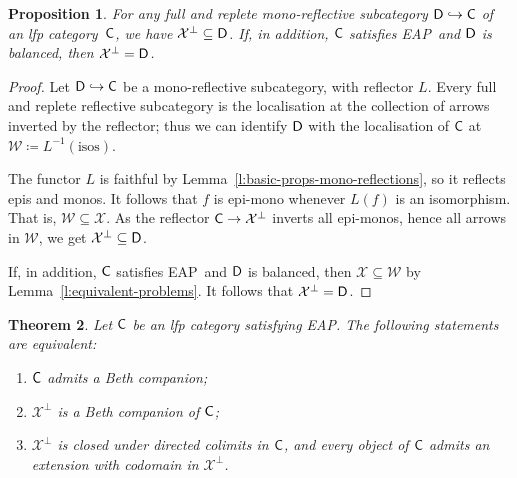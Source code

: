 \documentclass[a4paper,10pt,reqno]{amsart}
\newtheorem{theorem}{Theorem}[section]
\newtheorem{proposition}[theorem]{Proposition}
\theoremstyle{definition}
\theoremstyle{remark}
\newcommand{\cat}{{\sf C}}								%
\newcommand{\catt}{{\sf D}}								%
\newcommand{\ar}[1]{\mathcal{#1}}							%
\newcommand{\X}{\ar{X}}									%
\newcommand{\into}{\hookrightarrow}						%
\newcommand{\ort}[1]{{#1}^{\perp}}						%
\newcommand{\EAP}{\textnormal{EAP}}
\begin{document}
\begin{proposition}\label{p:localisation-is-X-ort}
For any full and replete mono-reflective subcategory $\catt\into \cat$ of an lfp category~$\cat$, we have $\ort{\X}\subseteq \catt$. If, in addition, $\cat$ satisfies \EAP~and $\catt$ is balanced, then $\ort{\X}= \catt$.
\end{proposition}
%
\begin{proof}
Let $\catt\into \cat$ be a mono-reflective subcategory, with reflector $L$. Every full and replete reflective subcategory is the localisation at the collection of arrows inverted by the reflector; thus we can identify $\catt$ with the localisation of $\cat$ at $\ar{W}\coloneqq L^{-1}(\text{isos})$. 

The functor $L$ is faithful by Lemma~\ref{l:basic-props-mono-reflections}, so it reflects epis and monos. It follows that $f$ is epi-mono whenever $L(f)$ is an isomorphism. That is, $\ar{W}\subseteq \X$.
%
As the reflector $\cat \to \ort{\X}$ inverts all epi-monos, hence all arrows in $\ar{W}$, we get $\ort{\X}\subseteq \catt$.

If, in addition, $\cat$ satisfies \EAP~and $\catt$ is balanced, then $\X\subseteq \ar{W}$ by Lemma~\ref{l:equivalent-problems}. It follows that $\ort{\X}= \catt$.
\end{proof}

\begin{theorem}\label{t:Beth-companion-amalgam-orthogonal}
Let $\cat$ be an lfp category satisfying \EAP.
The following statements are equivalent:
\begin{enumerate}[label=(\arabic*)]
\item\label{i:cat-has-Beth-comp-amal} $\cat$ admits a Beth companion;
\item\label{i:ort-X-is-Beth-comp} $\ort{\X}$ is a Beth companion of $\cat$;
\item\label{i:ort-X-closed-dir-colim} $\ort{\X}$ is closed under directed colimits in $\cat$, and every object of $\cat$ admits an extension with codomain in $\ort{\X}$.
\end{enumerate}
\end{theorem}
\end{document}
